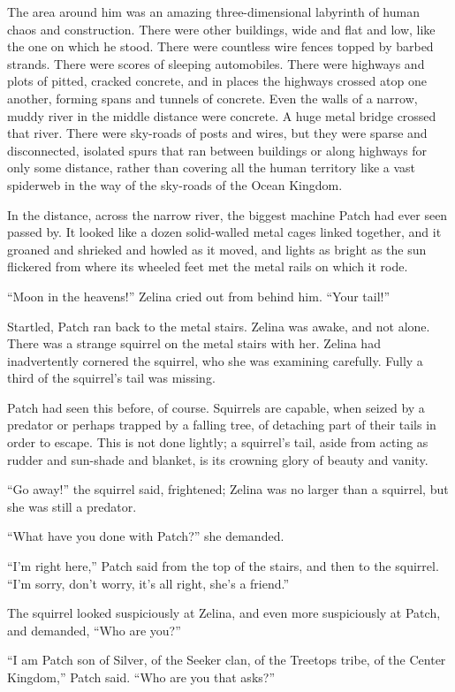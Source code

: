 \documentclass[ebook,oneside,openany,17pt]{memoir}
\begin{document}
The area around him was an amazing three-dimensional labyrinth of
human chaos and construction. There were other buildings, wide and
flat and low, like the one on which he stood. There were countless
wire fences topped by barbed strands. There were scores of sleeping
automobiles. There were highways and plots of pitted, cracked
concrete, and in places the highways crossed atop one another, forming
spans and tunnels of concrete. Even the walls of a narrow, muddy river
in the middle distance were concrete. A huge metal bridge crossed that
river. There were sky-roads of posts and wires, but they were sparse
and disconnected, isolated spurs that ran between buildings or along
highways for only some distance, rather than covering all the human
territory like a vast spiderweb in the way of the sky-roads of the
Ocean Kingdom.

In the distance, across the narrow river, the biggest machine Patch
had ever seen passed by. It looked like a dozen solid-walled metal
cages linked together, and it groaned and shrieked and howled as it
moved, and lights as bright as the sun flickered from where its
wheeled feet met the metal rails on which it rode.

“Moon in the heavens!” Zelina cried out from behind him. “Your tail!”

Startled, Patch ran back to the metal stairs. Zelina was awake, and
not alone. There was a strange squirrel on the metal stairs with
her. Zelina had inadvertently cornered the squirrel, who she was
examining carefully. Fully a third of the squirrel’s tail was missing.

Patch had seen this before, of course. Squirrels are capable, when
seized by a predator or perhaps trapped by a falling tree, of
detaching part of their tails in order to escape. This is not done
lightly; a squirrel’s tail, aside from acting as rudder and sun-shade
and blanket, is its crowning glory of beauty and vanity.

“Go away!” the squirrel said, frightened; Zelina was no larger than a
squirrel, but she was still a predator.

“What have you done with Patch?” she demanded.

“I’m right here,” Patch said from the top of the stairs, and then to
the squirrel. “I’m sorry, don’t worry, it’s all right, she’s a
friend.”

The squirrel looked suspiciously at Zelina, and even more suspiciously
at Patch, and demanded, “Who are you?”

“I am Patch son of Silver, of the Seeker clan, of the Treetops tribe,
of the Center Kingdom,” Patch said. “Who are you that asks?”
\end{document}
